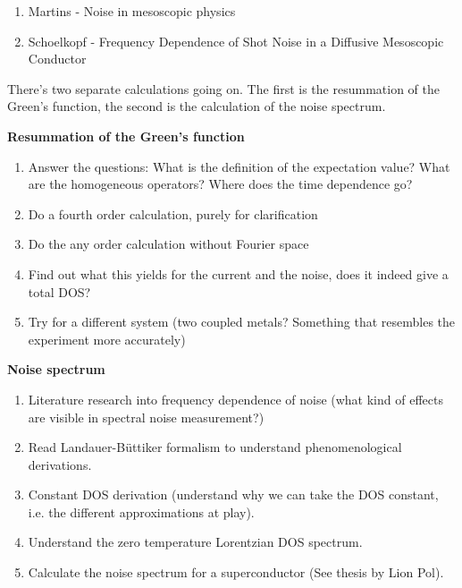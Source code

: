 \begin{tcolorbox}[title = Sources, colback = gray!5, colframe=gray]
    \begin{enumerate}
        \itemsep0em
        \item Martins - Noise in mesoscopic physics
        \item Schoelkopf - Frequency Dependence of Shot Noise in a Diffusive Mesoscopic Conductor
    \end{enumerate}
\end{tcolorbox}

\begin{tcolorbox}[title = Roadmap, colback = red!7!white, colbacktitle = red!95!black]
    There's two separate calculations going on. The first is the resummation of the Green's function, the second is the calculation of the noise spectrum. 

    \textbf{Resummation of the Green's function}
    \begin{enumerate}
        \itemsep0em
        \item Answer the questions: What is the definition of the expectation value? What are the homogeneous operators? Where does the time dependence go?
        \item Do a fourth order calculation, purely for clarification
        \item Do the any order calculation without Fourier space
        \item Find out what this yields for the current and the noise, does it indeed give a total DOS?
        \item Try for a different system (two coupled metals? Something that resembles the experiment more accurately)
    \end{enumerate}
    \textbf{Noise spectrum}
    \begin{enumerate}
        \itemsep0em
        \item Literature research into frequency dependence of noise (what kind of effects are visible in spectral noise measurement?)
        \item Read Landauer-Büttiker formalism to understand phenomenological derivations.
        \item Constant DOS derivation (understand why we can take the DOS constant, i.e. the different approximations at play).
        \item Understand the zero temperature Lorentzian DOS spectrum.
        \item Calculate the noise spectrum for a superconductor (See thesis by Lion Pol).
    \end{enumerate}
\end{tcolorbox}

